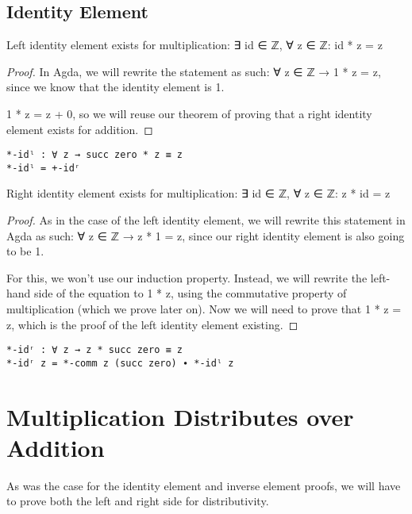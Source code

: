\begin{listing}[H]
\section{Identity Element}

\begin{theorem}
  Left identity element exists for multiplication: ∃ id ∈ ℤ, ∀ z ∈ ℤ: id * z = z
\end{theorem}

\begin{proof}
  In Agda, we will rewrite the statement as such: ∀ z ∈ ℤ → 1 * z = z, since we know that the identity element is 1.

  1 * z = z + 0, so we will reuse our theorem of proving that a right identity element exists for addition.
\end{proof}

\begin{verbatim}
*-idˡ : ∀ z → succ zero * z ≡ z
*-idˡ = +-idʳ
\end{verbatim}
\caption{Agda proof of multiplication having a left identity element}
\end{listing}

\begin{theorem}
  Right identity element exists for multiplication: ∃ id ∈ ℤ, ∀ z ∈ ℤ: z * id = z
\end{theorem}

\begin{proof}
  As in the case of the left identity element, we will rewrite this statement in Agda as such: ∀ z ∈ ℤ → z * 1 = z, since our right identity element is also going to be 1.

  For this, we won't use our induction property. Instead, we will rewrite the left-hand side of the equation to 1 * z, using the commutative property of multiplication (which we prove later on). Now we will need to prove that 1 * z = z, which is the proof of the left identity element existing.
\end{proof}

\begin{listing}[H]
\begin{verbatim}
*-idʳ : ∀ z → z * succ zero ≡ z
*-idʳ z = *-comm z (succ zero) ∙ *-idˡ z
\end{verbatim}
\caption{Agda proof of multiplication having a right identity element}
\end{listing}

\section{Multiplication Distributes over Addition}
As was the case for the identity element and inverse element proofs, we will have to prove both the left and right side for distributivity.

